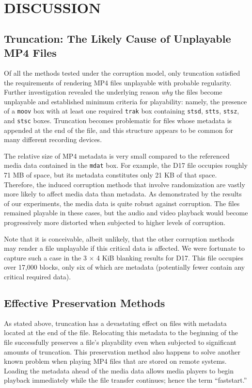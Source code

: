 \chapter{\uppercase{Discussion}}

\section{Truncation: The Likely Cause of Unplayable MP4 Files}

Of all the methods tested under the corruption model, only truncation satisfied the requirements of rendering MP4 files unplayable with probable regularity. Further investigation revealed the underlying reason \emph{why} the files become unplayable and established minimum criteria for playability: namely, the presence of a \texttt{moov} box with at least one required \texttt{trak} box containing \texttt{stsd}, \texttt{stts}, \texttt{stsz}, and \texttt{stsc} boxes. Truncation becomes problematic for files whose metadata is appended at the end of the file, and this structure appears to be common for many different recording devices.

The relative size of MP4 metadata is very small compared to the referenced media data contained in the \texttt{mdat} box. For example, the D17 file occupies roughly 71 MB of space, but its metadata constitutes only 21 KB of that space. Therefore, the induced corruption methods that involve randomization are vastly more likely to affect media data than metadata. As demonstrated by the results of our experiments, the media data is quite robust against corruption. The files remained playable in these cases, but the audio and video playback would become progressively more distorted when subjected to higher levels of corruption.

Note that it is conceivable, albeit unlikely, that the other corruption methods may render a file unplayable if this critical data is affected. We were fortunate to capture such a case in the 3 \( \times \) 4 KiB blanking results for D17. This file occupies over 17,000 blocks, only six of which are metadata (potentially fewer contain any critical required data).

\section{Effective Preservation Methods}

As stated above, truncation has a devastating effect on files with metadata located at the end of the file. Relocating this metadata to the beginning of the file successfully preserves a file's playability even when subjected to significant amounts of truncation. This preservation method also happens to solve another known problem when playing MP4 files that are stored on remote systems. Loading the metadata ahead of the media data allows media players to begin playback immediately while the file transfer continues; hence the term ``faststart.''

